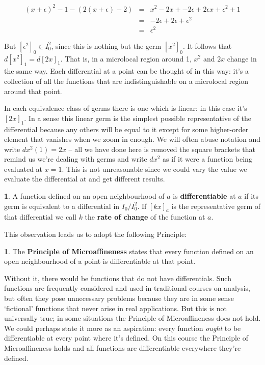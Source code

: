 \documentclass[oneside,english]{amsbook}
\numberwithin{section}{chapter}
\theoremstyle{plain}
\theoremstyle{definition}
\newtheorem{defn}[thm]{\protect\definitionname}
\providecommand{\definitionname}{Definition}
\begin{document}
			\begin{align}[rcl]
				(x + \epsilon)^2 - 1 - (2(x + \epsilon) - 2) &=& x^2 - 2x + - 2\epsilon + 2\epsilon x + \epsilon^2 +1 \\
                                           &=& - 2\epsilon + 2\epsilon + \epsilon^2 \\
                                           &=& \epsilon^2
			\end{align}

			But $[\epsilon^2]_0 \in I_0^2$, since this is nothing but the germ $[x^2]_0$. It follows that $d[x^2]_1 = d[2x]_1$. That is, in a microlocal region around 1, $x^2$ and $2x$ change in the same way. Each differential at a point can be thought of in this way: it's a collection of all the functions that are indistinguishable on a microlocal region around that point. 
			
			In each equivalence class of germs there is one which is linear: in this case it's $[2x]_1$. In a sense this linear germ is the simplest possible representative of the differential because any others will be equal to it except for some higher-order element that vanishes when we zoom in enough. We will often abuse notation and write $dx^2(1) = 2x$ -- all we have done here is removed the square brackets that remind us we're dealing with germs and write $dx^2$ as if it were a function being evaluated at $x = 1$. This is not unreasonable since we could vary the value we evaluate the differential at and get different results. 

			\begin{defn}
				A function defined on an open neighbourhood of $a$ is \textbf{differentiable} at $a$ if its germ is equivalent to a differential in $I_0/I_0^2$. If $[kx]_a$ is the representative germ of that differential we call $k$ the \textbf{rate of change} of the function at $a$. 
			\end{defn}
			
			This observation leads us to adopt the following Principle: 

			\begin{defn}
				The \textbf{Principle of Microaffineness} states that every function defined on an open neighbourhood of a point is differentiable at that point. 
			\end{defn}
			
			Without it, there would be functions that do not have differentials. Such functions are frequently considered and used in traditional courses on analysis, but often they pose unnecessary problems because they are in some sense `fictional' functions that never arise in real applications. But this is not universally true; in some situations the Principle of Microaffineness does not hold. We could perhaps state it more as an aspiration: every function \emph{ought} to be differentiable at every point where it's defined. On this course the Principle of Microaffineness holds and all functions are differentiable everywhere they're defined.
\end{document}

